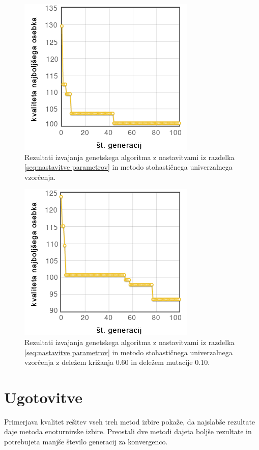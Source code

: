 \documentclass[a4paper, 12pt]{book}
\begin{document}
\begin{figure}
\centering
\includegraphics[scale=0.70]{stoh_izbira.png}
\caption{Rezultati izvajanja genetskega algoritma z nastavitvami iz razdelka \ref{seq:nastavitve parametrov} in metodo stohasti\v cnega univerzalnega vzor\v cenja.}
\label{fig5}
\end{figure}

\begin{figure}
\centering
\includegraphics[scale=0.70]{stoh_brez_mut.png}
\caption{Rezultati izvajanja genetskega algoritma z nastavitvami iz razdelka \ref{seq:nastavitve parametrov} in metodo stohasti\v cnega univerzalnega vzor\v cenja z dele\v zem kri\v zanja 0.60 in dele\v zem mutacije 0.10.}
\label{stoh brez mutacije}
\end{figure}

\section{Ugotovitve}

Primerjava kvalitet re\v sitev vseh treh metod izbire poka\v ze, da najslab\v se rezultate daje metoda enoturnirske izbire. Preostali dve metodi dajeta bolj\v se rezultate in potrebujeta manj\v se \v stevilo generacij za konvergenco.
\end{document}
